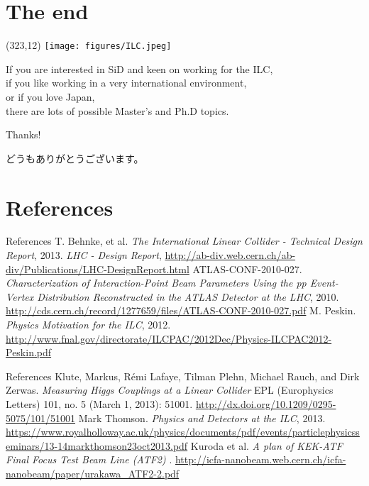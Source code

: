 \documentclass[xcolor={dvipsnames}]{beamer}
\newcommand{\ilclogo}{
  \setlength{\TPHorizModule}{1pt}
  \setlength{\TPVertModule}{1pt}
  \begin{textblock}{1}(323,12)
   \texttt{[image: figures/ILC.jpeg]}
  \end{textblock}
}
\begin{document}
\section*{The end}
{
\begin{frame}
\ilclogo
\begin{center}
If you are interested in SiD and keen on working for the ILC, \\
if you like working in a very international environment, \\
or if you love Japan,\\
there are lots of possible Master's and Ph.D topics.\\
\vspace*{1cm}
\textcolor{RubineRed}{
	\LARGE Thanks!\\
	\begin{CJK}{UTF8}{min}
	どうもありがとうございます。
	\end{CJK}
}
\end{center}
\end{frame}
}

\section*{References}
\begin{thebibliography}{9}
\begin{frame}{References}
 T. Behnke, et al.
\emph{The International Linear Collider - Technical Design Report}, 2013.
 \emph{LHC - Design Report}, \url{http://ab-div.web.cern.ch/ab-div/Publications/LHC-DesignReport.html}
 ATLAS-CONF-2010-027. \emph{Characterization of Interaction-Point Beam Parameters Using the pp Event-Vertex Distribution Reconstructed in the ATLAS Detector at the LHC}, 2010. \url{http://cds.cern.ch/record/1277659/files/ATLAS-CONF-2010-027.pdf}
 M. Peskin. \emph{Physics Motivation for the ILC}, 2012. \url{http://www.fnal.gov/directorate/ILCPAC/2012Dec/Physics-ILCPAC2012-Peskin.pdf}
\end{frame}
\begin{frame}{References}
 Klute, Markus, Rémi Lafaye, Tilman Plehn, Michael Rauch, and
Dirk Zerwas. \emph{Measuring Higgs Couplings at a Linear Collider}
EPL (Europhysics Letters) 101, no. 5 (March 1, 2013): 51001. \url{http://dx.doi.org/10.1209/0295-5075/101/51001}
 Mark Thomson. \emph{Physics and Detectors at the ILC}, 2013. \url{https://www.royalholloway.ac.uk/physics/documents/pdf/events/particlephysicsseminars/13-14markthomson23oct2013.pdf}
 Kuroda et al. \emph{A plan of KEK-ATF Final Focus Test Beam Line (ATF2)
}. \url{http://icfa-nanobeam.web.cern.ch/icfa-nanobeam/paper/urakawa_ATF2-2.pdf}

\end{frame}
\end{thebibliography}
\end{document}
